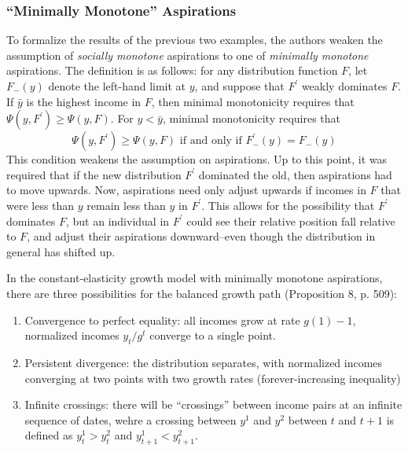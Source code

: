 \documentclass[11pt]{article}
\begin{document}
    \subsubsection{``Minimally Monotone'' Aspirations}
    To formalize the results of the previous two examples, the authors weaken the assumption of \textit{socially monotone} aspirations to one of \textit{minimally monotone} aspirations. The definition is as follows: for any distribution function \( F \), let \( F_-(y) \) denote the left-hand limit at \( y \), and suppose that \( F^\prime \) weakly dominates \( F \). If \( \bar{y} \) is the highest income in \( F \), then minimal monotonicity requires that \( \Psi(y, F^\prime) \geq \Psi(y, F) \). For \( y < \bar{y} \), minimal monotonicity requires that 
    \[\Psi(y, F^\prime) \geq \Psi(y, F)\text{ if and only if }
    F^\prime_-(y) = F_-(y)\]
    This condition weakens the assumption on aspirations. Up to this point, it was required that if the new distribution \( F^\prime \) dominated the old, then aspirations had to move upwards. Now, aspirations need only adjust upwards if incomes in \( F \) that were less than \( y \) remain less than \( y \) in \( F^\prime \). This allows for the possibility that \( F^\prime \) dominates \( F \), but an individual in \( F^\prime \) could see their relative position fall relative to \( F \), and adjust their aspirations downward--even though the distribution in general has shifted up. 

    In the constant-elasticity growth model with minimally monotone aspirations, there are three possibilities for the balanced growth path (Proposition 8, p. 509):
    \begin{enumerate}
        \item Convergence to perfect equality: all incomes grow at rate \( g(1) - 1 \), normalized incomes \( y_t / g^t \) converge to a single point. 
        \item Persistent divergence: the distribution separates, with normalized incomes converging at two points with two growth rates (forever-increasing inequality)
        \item Infinite crossings: there will be ``crossings'' between income pairs at an infinite sequence of dates, wehre a crossing between \( y^1 \) and \( y^2 \) between \( t \) and \( t+1 \) is defined as \( y^1_t > y^2_t \) and \( y^1_{t+1} < y^2_{t+1} \).
    \end{enumerate}
\end{document}
